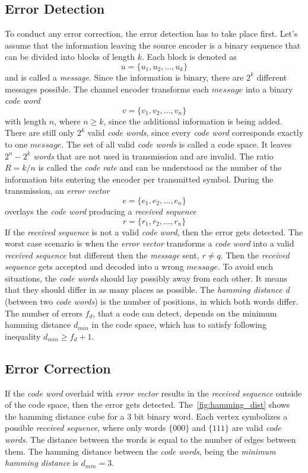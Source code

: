 \subsection{Error Detection}
To conduct any error correction, the error detection has to take place first. Let's assume that the information leaving the source encoder is a binary sequence that can be divided into blocks of length $k$. Each block is denoted as 
$$u=\{u_1,u_2,...,u_k\}$$ 
and is called a \textit{message}. Since the information is binary, there are $2^k$ different messages possible. The channel encoder transforms each $message$ into a binary \textit{code word} 
$$v=\{v_1,v_2,...,v_n\}$$ 
with length $n$, where $n\geq k$, since the additional information is being added. There are still only $2^k$ valid \textit{code words}, since every \textit{code word} corresponds exactly to one $message$. The set of all valid \textit{code words} is called a code space. It leaves $2^n - 2^k$ \textit{words} that are not used in transmission and are invalid. The ratio $R=k/n$ is called the \textit{code rate} and can be understood as the number of the information bits entering the encoder per transmitted symbol. During the transmission, an \textit{error vector} 
$$e=\{e_1,e_2,...,e_n\}$$ 
overlays the \textit{code word} producing a \textit{received sequence} 
$$r=\{r_1,r_2,...,r_n\}$$
If the \textit{received sequence} is not a valid \textit{code word}, then the error gets detected. The worst case scenario is when the \textit{error vector} transforms a \textit{code word} into a valid \textit{received sequence} but different then the \textit{message} sent, $r\neq q$. Then the \textit{received sequence} gets accepted and decoded into a wrong $message$. To avoid such situations, the \textit{code words} should lay possibly away from each other. It means that they should differ in as many places as possible. The \textit{hamming distance d} (between two \textit{code words}) is the number of positions, in which both words differ. The number of errors $f_d$, that a code can detect, depends on the minimum hamming distance $d_{min}$ in the code space, which has to satisfy following inequality $d_{min} \geq f_d + 1$.
\subsection{Error Correction}
If the \textit{code word} overlaid with \textit{error vector} results in the \textit{received sequence} outside of the code space, then the error gets detected. The~\autoref{fig:hamming_dist} shows the hamming distance cube for a 3 bit binary word. Each vertex symbolizes a possible \textit{received sequence}, where only words $\{000\}$ and $\{111\}$ are valid \textit{code words}. The distance between the words is equal to the number of edges between them. The hamming distance between the \textit{code words}, being the \textit{minimum hamming distance} is $d_{min}=3$.

